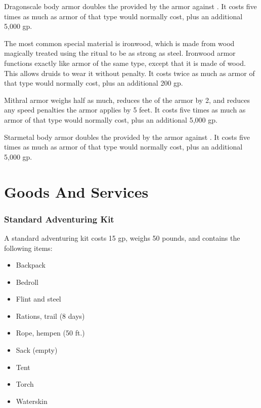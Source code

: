          Dragonscale body armor doubles the  provided by the armor against .
        It costs five times as much as armor of that type would normally cost, plus an additional 5,000 gp.

         The most common special material is ironwood, which is made from wood magically treated using the  ritual to be as strong as steel. Ironwood armor functions exactly like  armor of the same type, except that it is made of wood. This allows druids to wear it without penalty.
        It costs twice as much as armor of that type would normally cost, plus an additional 200 gp.

         Mithral armor weighs half as much, reduces the  of the armor by 2, and reduces any speed penalties the armor applies by 5 feet.
        It costs five times as much as armor of that type would normally cost, plus an additional 5,000 gp.

         Starmetal body armor doubles the  provided by the armor against .
        It costs five times as much as armor of that type would normally cost, plus an additional 5,000 gp.

\section{Goods And Services}

    \subsubsection{Standard Adventuring Kit}
        A standard adventuring kit costs 15 gp, weighs 50 pounds, and contains the following items:
        \begin{itemize}
            \item Backpack
            \item Bedroll
            \item Flint and steel
            \item Rations, trail (8 days)
            \item Rope, hempen (50 ft.)
            \item Sack (empty)
            \item Tent
            \item Torch
            \item Waterskin
        \end{itemize}

